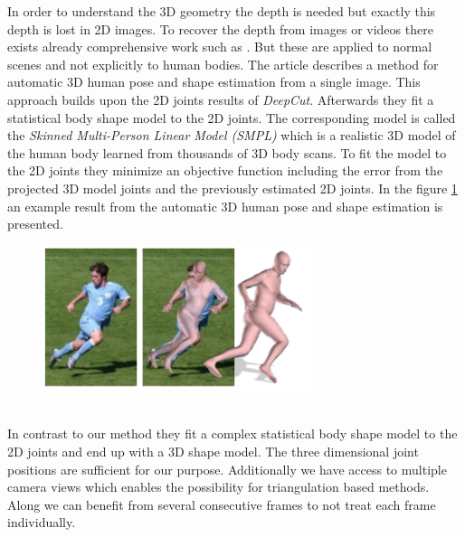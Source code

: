 In order to understand the 3D geometry the depth is needed but exactly this depth is lost in 2D images. To recover the depth from images or videos there exists already comprehensive work such as \cite{depth_estimation,depth_map}. But these are applied to normal scenes and not explicitly to human bodies. The article \cite{3dpose} describes a method for automatic 3D human pose and shape estimation from a single image. This approach builds upon the 2D joints results of \textit{DeepCut}\cite{deepcut}. Afterwards they fit a statistical body shape model to the 2D joints. The corresponding model is called the \textit{Skinned Multi-Person Linear Model (SMPL)} \cite{smpl} which is a realistic 3D model of the human body learned from thousands of 3D body scans. To fit the model to the 2D joints they minimize an objective function including the error from the projected 3D model joints and the previously estimated 2D joints. In the figure \ref{fig:3dpose_example} an example result from the automatic 3D human pose and shape estimation is presented.
\begin{figure}[h]
	\centering
	\includegraphics[width=0.7\textwidth]{./images/3dpose_example.jpg}
	\label{fig:3dpose_example}
\end{figure}\\
In contrast to our method they fit a complex statistical body shape model to the 2D joints and end up with a 3D shape model. The three dimensional joint positions are sufficient for our purpose. Additionally we have access to multiple camera views which enables the possibility for triangulation based methods. Along we can benefit from several consecutive frames to not treat each frame individually.


